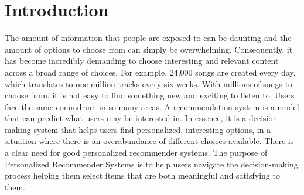 \chapter{Introduction}

The amount of information that people are exposed to can be daunting and the amount of options to choose from can simply be overwhelming. Consequently, it has become incredibly demanding to choose interesting and relevant content across a broad range of choices. For example, 24,000 songs are created every day, which translates to one million tracks every six weeks. With millions of songs to choose from, it is not easy to find something new and exciting to listen to. Users face the same conundrum in so many areas. 
A recommendation system is a model that can predict what users may be interested in. In essence, it is a decision-making system that helps users find personalized, interesting options, in a situation where there is an overabundance of different choices 
available. There is a clear need for good personalized recommender systems. 
The purpose of Personalized Recommender Systems is to help users navigate the  decision-making process helping them select items that are both meaningful and satisfying to them.
